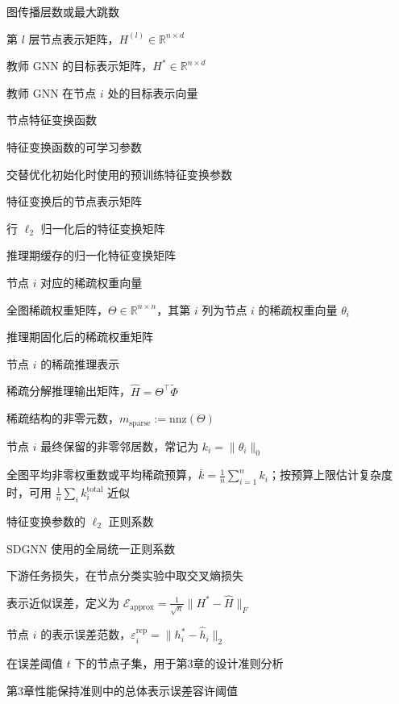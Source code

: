 \begin{denotation}[4.0cm]
  \item[$L$] 图传播层数或最大跳数
  \item[$H^{(l)}$] 第 $l$ 层节点表示矩阵，$H^{(l)}\in\mathbb{R}^{n\times d}$
  \item[$H^*$] 教师 GNN 的目标表示矩阵，$H^*\in\mathbb{R}^{n\times d}$
  \item[$h_i^*$] 教师 GNN 在节点 $i$ 处的目标表示向量
  \item[$\phi(\cdot;W_\phi)$] 节点特征变换函数
  \item[$W_\phi$] 特征变换函数的可学习参数
  \item[$W_\phi^*$] 交替优化初始化时使用的预训练特征变换参数
  \item[$\Phi=\phi(X;W_\phi)$] 特征变换后的节点表示矩阵
  \item[$\tilde{\Phi}$] 行 $\ell_2$ 归一化后的特征变换矩阵
  \item[$\tilde{\Phi}^{\mathrm{cache}}$] 推理期缓存的归一化特征变换矩阵
  \item[$\theta_i$] 节点 $i$ 对应的稀疏权重向量
  \item[$\Theta$] 全图稀疏权重矩阵，$\Theta\in\mathbb{R}^{n\times n}$，其第 $i$ 列为节点 $i$ 的稀疏权重向量 $\theta_i$
  \item[$\Theta^{\mathrm{fixed}}$] 推理期固化后的稀疏权重矩阵
  \item[$\hat{h}(i)$] 节点 $i$ 的稀疏推理表示
  \item[$\hat{H}$] 稀疏分解推理输出矩阵，$\hat{H}=\Theta^\top\tilde{\Phi}$
  \item[$m_{\mathrm{sparse}}$] 稀疏结构的非零元数，$m_{\mathrm{sparse}}:=\mathrm{nnz}(\Theta)$
  \item[$k_i$] 节点 $i$ 最终保留的非零邻居数，常记为 $k_i=\|\theta_i\|_0$
  \item[$\bar{k}$] 全图平均非零权重数或平均稀疏预算，$\bar{k}=\frac{1}{n}\sum_{i=1}^n k_i$；按预算上限估计复杂度时，可用 $\frac{1}{n}\sum_i k_i^{\mathrm{total}}$ 近似
  \item[$\lambda_W$] 特征变换参数的 $\ell_2$ 正则系数
  \item[$\lambda_{\mathrm{reg}}$] SDGNN 使用的全局统一正则系数
  \item[$\mathcal{L}_{\mathrm{task}}$] 下游任务损失，在节点分类实验中取交叉熵损失
  \item[$\mathcal{E}_{\mathrm{approx}}$] 表示近似误差，定义为 $\mathcal{E}_{\mathrm{approx}}=\frac{1}{\sqrt{n}}\|H^*-\hat{H}\|_F$
  \item[$\varepsilon_i^{\mathrm{rep}}$] 节点 $i$ 的表示误差范数，$\varepsilon_i^{\mathrm{rep}}=\|h_i^*-\hat{h}_i\|_2$
  \item[$\mathcal{S}(t)$] 在误差阈值 $t$ 下的节点子集，用于第3章的设计准则分析
  \item[$\varepsilon_0$] 第3章性能保持准则中的总体表示误差容许阈值


\end{denotation}
